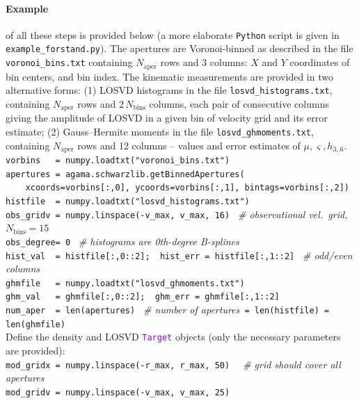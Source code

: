 \documentclass[12pt]{article}
\newcommand{\Python}{\texttt{Python}\xspace}
\newcommand{\ttt}[1]{\textcolor{darkviolet}{\texttt{#1}}}
\let\oldparagraph\paragraph
\renewcommand{\paragraph}[1]{\vspace{-2mm}\oldparagraph{#1}}
\begin{document}
\paragraph{Example} \label{sec:SchwarzschildExample} of all these steps is provided below (a more elaborate \Python script is given in \texttt{example_forstand.py}). The apertures are Voronoi-binned as described in the file \texttt{voronoi_bins.txt} containing $N_\mathrm{aper}$ rows and 3 columns: $X$ and $Y$ coordinates of bin centers, and bin index. The kinematic measurements are provided in two alternative forms: (1) LOSVD histograms in the file \texttt{losvd_histograms.txt}, containing $N_\mathrm{aper}$ rows and $2\,N_\mathrm{bins}$ columns, each pair of consecutive columns giving the amplitude of LOSVD in a given bin of velocity grid and its error estimate; (2) Gauss--Hermite moments in the file \texttt{losvd_ghmoments.txt}, containing $N_\mathrm{aper}$ rows and 12 columns -- values and error estimates of $\mu, \varsigma, h_{3..6}$.\\[2mm]
\texttt{vorbins~~~= numpy.loadtxt("voronoi_bins.txt")\\
apertures~= agama.schwarzlib.getBinnedApertures(\\
\mbox{}~~~~xcoords=vorbins[:,0], ycoords=vorbins[:,1], bintags=vorbins[:,2])\\
histfile~~= numpy.loadtxt("losvd_histograms.txt")\\
obs_gridv~= numpy.linspace(-v_max, v_max, 16)}
\textit{\color{Sepia} \ \# observational vel.~grid, $N_\mathrm{bins}=15$}\\
\texttt{obs_degree= 0}
\textit{\color{Sepia} \ \# histograms are 0th-degree B-splines}\\
\texttt{hist_val~~= histfile[:,0::2];~~hist_err = histfile[:,1::2]}
\textit{\color{Sepia} \ \# odd/even columns}\\
\texttt{ghmfile~~~= numpy.loadtxt("losvd_ghmoments.txt")\\
ghm_val~~~= ghmfile[:,0::2];~~ghm_err = ghmfile[:,1::2]\\
num_aper~~= len(apertures)} 
{\color{Sepia}\textit{\ \# number of apertures}\texttt{ = len(histfile) = len(ghmfile)}}\\[2mm]
Define the density and LOSVD \ttt{Target} objects (only the necessary parameters are provided):\\[2mm]
\texttt{mod_gridx~= numpy.linspace(-r_max, r_max, 50)}
\textit{\color{Sepia} \ \ \# grid should cover all apertures}\\
\texttt{mod_gridv~= numpy.linspace(-v_max, v_max, 25)}
\end{document}
